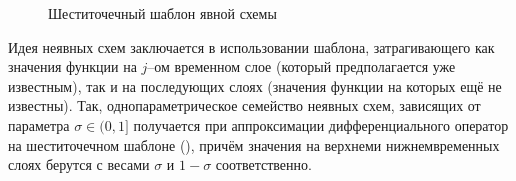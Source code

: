 \begin{figure}[h]
    \centering
    \caption{Шеститочечный шаблон явной схемы}
    \label{fig:implicit_template}
\end{figure}
Идея неявных схем заключается в использовании шаблона, затрагивающего как значения функции на $j$--ом временном слое (который предполагается уже известным), так и на последующих слоях (значения функции на которых ещё не известны).
Так, однопараметрическое семейство неявных схем, зависящих от параметра $\sigma \in (0, 1]$ получается при аппроксимации дифференциального оператор на шеститочечном шаблоне (), причём значения на \glqq верхнем\grqq и \glqq нижнем\grqq временных слоях берутся с весами $\sigma$ и $1 - \sigma$ соответственно.

